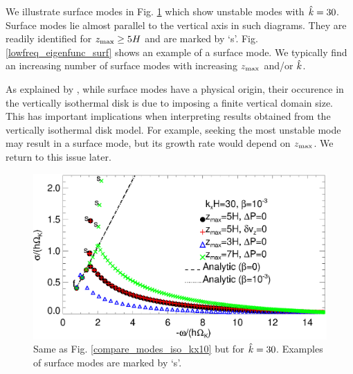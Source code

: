 We illustrate surface modes in Fig. \ref{compare_modes_iso_kx30} 
which show unstable modes with $\hat{k}=30$. Surface 
modes lie almost parallel to the vertical axis 
in such diagrams. They are readily identified for  $z_\mathrm{max}\geq 5H$ and
are marked by `s'.  Fig. \ref{lowfreq_eigenfunc_surf} shows an example
of a surface mode. We typically find an increasing
number of surface modes with increasing $z_\mathrm{max}$ and/or $\hat{k}$. 
 
As explained by , while surface modes have a physical
origin, their occurence in the vertically isothermal disk is due to
imposing a finite vertical domain size. This has important
implications when interpreting results obtained from the vertically
isothermal disk model. For example, seeking the most unstable mode may
result in a surface mode, but its growth rate would depend on
$z_\mathrm{max}$. We return to this issue later.     


\begin{figure}
  \includegraphics[width=\linewidth]{figures/compare_modes_iso_kx30_analytic.ps}
  \caption{Same as Fig. \ref{compare_modes_iso_kx10} but for
    $\hat{k}=30$. Examples of surface modes are 
    marked by `s'. \label{compare_modes_iso_kx30}
  }
\end{figure}


